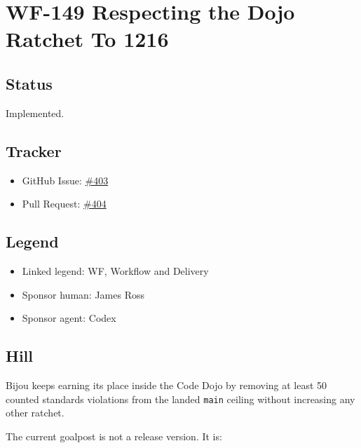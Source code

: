 \chapter{WF-149 Respecting the Dojo Ratchet To 1216}\label{record-231}

\smallskip

\section{Status}\label{record-231-status}

Implemented.

\section{Tracker}\label{record-231-tracker}

\begin{itemize}
\tightlist
\item
  GitHub Issue: \href{https://github.com/flyingrobots/bijou/issues/403}{\#403}
\item
  Pull Request: \href{https://github.com/flyingrobots/bijou/pull/404}{\#404}
\end{itemize}

\section{Legend}\label{record-231-legend}

\begin{itemize}
\tightlist
\item
  Linked legend: WF, Workflow and Delivery
\item
  Sponsor human: James Ross
\item
  Sponsor agent: Codex
\end{itemize}

\section{Hill}\label{record-231-hill}

Bijou keeps earning its place inside the Code Dojo by removing at least 50 counted standards violations from the landed \texttt{m\allowbreak{}a\allowbreak{}i\allowbreak{}n} ceiling without increasing any other ratchet.

The current goalpost is not a release version. It is:


